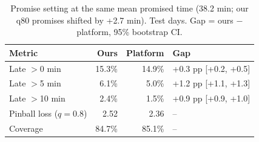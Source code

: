 \begin{table}[t]
\centering
\caption{Promise setting at the same mean promised time (38.2 min; our q80 promises shifted by +2.7 min). Test days. Gap = ours $-$ platform, 95\% bootstrap CI.}
\label{tab:promise}
\begin{tabular}{lrrl}
\toprule
Metric & Ours & Platform & Gap \\
\midrule
Late $>$0 min & 15.3\% & 14.9\% & +0.3 pp [+0.2, +0.5] \\
Late $>$5 min & 6.1\% & 5.0\% & +1.2 pp [+1.1, +1.3] \\
Late $>$10 min & 2.4\% & 1.5\% & +0.9 pp [+0.9, +1.0] \\
Pinball loss ($q=0.8$) & 2.52 & 2.36 & -- \\
Coverage & 84.7\% & 85.1\% & -- \\
\bottomrule
\end{tabular}
\end{table}
